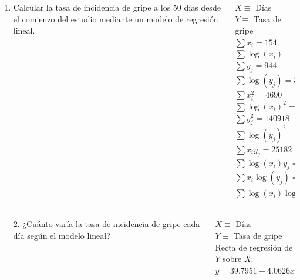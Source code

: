 \documentclass[aspectratio=149,10pt,t]{beamer}
\begin{document}
\begin{frame}
	\begin{columns}
		\begin{column}[T]{0.64\textwidth}
			\begin{enumerate}
				\item Calcular la tasa de incidencia de gripe a los 50 días desde el comienzo del estudio mediante un modelo de regresión lineal.
			\end{enumerate}
		\end{column}
		\begin{column}[T]{0.36\textwidth}
			\begin{datos}
				$X\equiv$ Días\\
				$Y\equiv$ Tasa de gripe\\
				$\sum x_i=154$\\
				$\sum \log(x_i)=19.8494$\\ 
				$\sum y_j=944$\\ 
				$\sum \log(y_j)=37.2024$\\
				$\sum x_i^2=4690$\\
				$\sum \log(x_i)^2=60.2309$\\
				$\sum y_j^2=140918$\\
				$\sum \log(y_j)^2=174.8363$\\
				$\sum x_iy_j=25182$\\
				$\sum \log(x_i)y_j=2795.2484$\\
				$\sum x_i\log(y_j)=772.3504$\\
				$\sum \log(x_i)\log(y_j)=96.1974$
			\end{datos}
		\end{column}
	\end{columns}
\end{frame}


\begin{frame}
	\begin{columns}
		\begin{column}[T]{0.55\textwidth}
			\begin{enumerate}
				\item[2.] ¿Cuánto varía la tasa de incidencia de gripe cada día según el modelo lineal?
			\end{enumerate}
		\end{column}
		\begin{column}[T]{0.45\textwidth}
			\begin{datos}
				$X\equiv$ Días\\
				$Y\equiv$ Tasa de gripe\\
				Recta de regresión de $Y$ sobre $X$:\\
				$y=39.7951+4.0626x$ 
			\end{datos}
		\end{column}
	\end{columns}
\end{frame}
\end{document}
